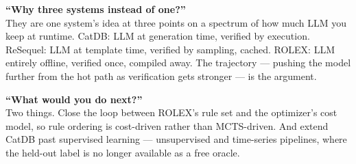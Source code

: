\documentclass[11pt]{article}
\begin{document}
\noindent\textbf{``Why three systems instead of one?''}\\
They are one system's idea at three points on a spectrum of how much LLM you
keep at runtime. CatDB: LLM at generation time, verified by execution.
ReSequel: LLM at template time, verified by sampling, cached. ROLEX: LLM
entirely offline, verified once, compiled away. The trajectory --- pushing the
model further from the hot path as verification gets stronger --- is the
argument.

\noindent\textbf{``What would you do next?''}\\
Two things. Close the loop between ROLEX's rule set and the optimizer's cost
model, so rule ordering is cost-driven rather than MCTS-driven. And extend
CatDB past supervised learning --- unsupervised and time-series pipelines,
where the held-out label is no longer available as a free oracle.
\end{document}
